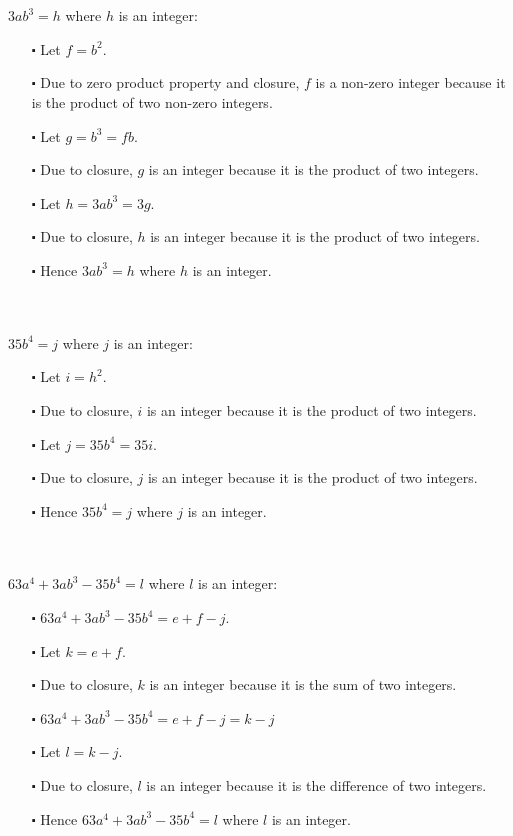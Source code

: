 \documentclass[12pt]{article}
\begin{document}
\newblock
\\ \\
$3ab^3 = h$ where $h$ is an integer:
\begin{itemize}
  \item [$\centerdot$] Let $f = b^2$.
  \item  [$\centerdot$] Due to zero product property and closure, $f$ is a non-zero integer because it is the product of two non-zero integers.
  \item [$\centerdot$] Let $g = b^3 = fb$.
  \item [$\centerdot$] Due to closure, $g$ is an integer because it is the product of two integers.
  \item [$\centerdot$] Let $h=3ab^3 = 3g$.
  \item [$\centerdot$] Due to closure, $h$ is an integer because it is the product of two integers.
  \item [$\centerdot$] Hence $3ab^3 = h$ where $h$ is an integer.
\end{itemize}
\newblock
\\ \\
$35b^4 = j$ where $j$ is an integer:
\begin{itemize}
  \item [$\centerdot$] Let $i = h^2$.
  \item [$\centerdot$] Due to closure, $i$ is an integer because it is the product of two integers.
  \item [$\centerdot$] Let $j = 35b^4 = 35i$.
  \item [$\centerdot$] Due to closure, $j$ is an integer because it is the product of two integers.
  \item [$\centerdot$] Hence $35b^4 = j$ where $j$ is an integer.
\end{itemize}
\newblock
\\ \\
$63a^4 + 3ab^3 - 35b^4=l$ where $l$ is an integer:
\begin{itemize}
  \item [$\centerdot$] $63a^4 + 3ab^3 - 35b^4 = e + f - j$.
  \item [$\centerdot$] Let $k = e + f$.
  \item [$\centerdot$] Due to closure, $k$ is an integer because it is the sum of two integers.
  \item [$\centerdot$] $63a^4 + 3ab^3 - 35b^4 = e + f - j = k - j$
  \item [$\centerdot$] Let $l = k-j$.
  \item [$\centerdot$] Due to closure, $l$ is an integer because it is the difference of two integers.
  \item [$\centerdot$] Hence $63a^4 + 3ab^3 - 35b^4 = l$ where $l$ is an integer.
\end{itemize}
\end{document}

